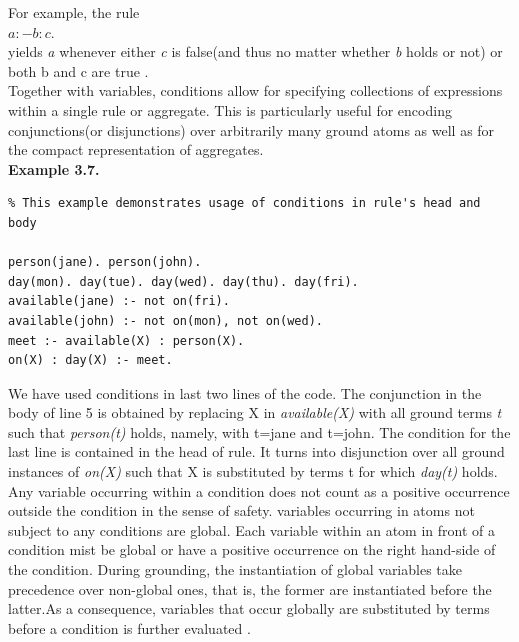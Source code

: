 \documentclass[14pt,a4paper, titlepage]{article}
\begin{document}
For example, the rule \\$a :- b : c. $ \\yields \textit{a} whenever either \textit{c} is false(and thus no matter whether \textit{b} holds or not) or both b and c are true \cite{pott}. \\Together  with variables, conditions allow for specifying collections of expressions within a single rule or aggregate. This is particularly useful for encoding conjunctions(or disjunctions) over arbitrarily many ground atoms as well as for the compact representation of aggregates. 
\\ \textbf{Example 3.7.}
\begin{lstlisting}
% This example demonstrates usage of conditions in rule's head and body

person(jane). person(john).
day(mon). day(tue). day(wed). day(thu). day(fri).
available(jane) :- not on(fri).
available(john) :- not on(mon), not on(wed).
meet :- available(X) : person(X).
on(X) : day(X) :- meet.
\end{lstlisting}  
We have used conditions in last two lines of the code. The conjunction in the body of line 5 is obtained by replacing X in \textit{available(X)} with all ground terms \textit{t} such that \textit{person(t)} holds, namely, with t=jane and t=john. The condition for the last line is contained in the head of rule. It turns into disjunction over all ground instances of \textit{on(X)} such that X is substituted by terms t for which \textit{day(t)} holds. Any variable occurring within a condition does not count as a positive occurrence outside the condition in the sense of safety. variables occurring in atoms not subject to any conditions are global. Each variable within an atom in front of a condition mist be global or have a positive occurrence on the right hand-side of the condition. During grounding, the instantiation of global variables take precedence over non-global ones, that is, the former are instantiated before the latter.As a consequence, variables that occur globally are substituted by terms before a condition is further evaluated \cite{pott}.    
\end{document}
